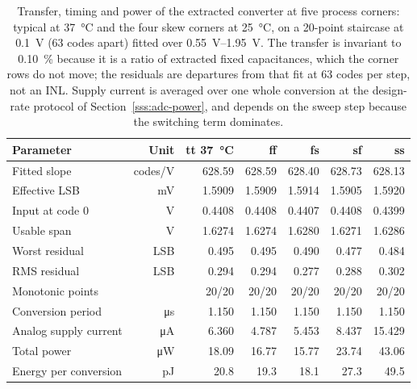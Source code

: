 \begin{table}[htbp]
  \centering
  \caption[{Transfer, timing and power of the extracted converter at five process corners.}]{Transfer, timing and power of the extracted converter at five process corners: typical at \SI{37}{\celsius} and the four skew corners at \SI{25}{\celsius}, on a 20-point staircase at \SI{0.1}{\volt} (63 codes apart) fitted over \SIrange{0.55}{1.95}{\volt}. The transfer is invariant to \SI{0.10}{\percent} because it is a ratio of extracted fixed capacitances, which the corner rows do not move; the residuals are departures from that fit at 63 codes per step, not an INL. Supply current is averaged over one whole conversion at the design-rate protocol of Section~\ref{sss:adc-power}, and depends on the sweep step because the switching term dominates.}
  \label{tab:adc-corners}
  \begin{tabular}{lrrrrrr}
    \toprule
    Parameter & Unit & tt \SI{37}{\celsius} & ff & fs & sf & ss \\
    \midrule
    Fitted slope       & codes/V & 628.59 & 628.59 & 628.40 & 628.73 & 628.13 \\
    Effective LSB      & \si{\milli\volt} & 1.5909 & 1.5909 & 1.5914 & 1.5905 & 1.5920 \\
    Input at code 0    & \si{\volt} & 0.4408 & 0.4408 & 0.4407 & 0.4408 & 0.4399 \\
    Usable span        & \si{\volt} & 1.6274 & 1.6274 & 1.6280 & 1.6271 & 1.6286 \\
    Worst residual     & LSB & 0.495 & 0.495 & 0.490 & 0.477 & 0.484 \\
    RMS residual       & LSB & 0.294 & 0.294 & 0.277 & 0.288 & 0.302 \\
    Monotonic points   &     & 20/20 & 20/20 & 20/20 & 20/20 & 20/20 \\
    \midrule
    Conversion period  & \si{\micro\second} & 1.150 & 1.150 & 1.150 & 1.150 & 1.150 \\
    Analog supply current & \si{\micro\ampere} & 6.360 & 4.787 & 5.453 & 8.437 & 15.429 \\
    Total power        & \si{\micro\watt} & 18.09 & 16.77 & 15.77 & 23.74 & 43.06 \\
    Energy per conversion & \si{\pico\joule} & 20.8 & 19.3 & 18.1 & 27.3 & 49.5 \\
    \bottomrule
  \end{tabular}
\end{table}
